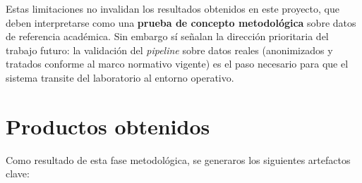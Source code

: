 \documentclass[IB]{TFUOC}%
\begin{document}
\noindent Estas limitaciones no invalidan los resultados obtenidos en este 
proyecto, que deben interpretarse como una \textbf{prueba de concepto 
metodológica} sobre datos de referencia académica. Sin embargo sí señalan 
la dirección prioritaria del trabajo futuro: la validación del \textit{pipeline} 
sobre datos reales (anonimizados y tratados conforme al marco normativo 
vigente) es el paso necesario para que el sistema transite del laboratorio 
al entorno operativo.


    
\section{Productos obtenidos}

Como resultado de esta fase metodológica, se generaros los siguientes artefactos clave:
\end{document}
